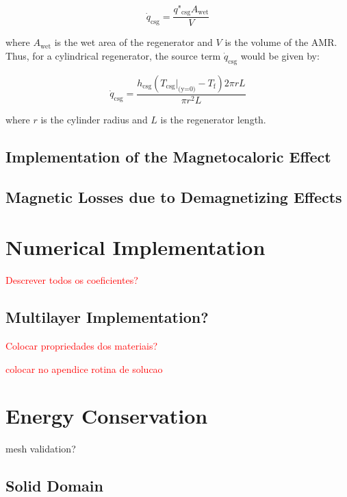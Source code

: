 \documentclass[review,preprint,12pt]{elsarticle}
\begin{document}
\begin{equation}
\dot{q}_\textrm{csg} = \frac{q\textrm{"}_\textrm{csg}A_\textrm{wet}}{V}
\label{Q_csg}
\end{equation}

\noindent where $A_\textrm{wet}$ is the wet area of the regenerator and $V$ is the volume of the AMR. Thus, for a cylindrical regenerator, the source term $\dot{q}_\textrm{csg}$ would be given by:

\begin{equation}
\dot{q}_\textrm{csg} = \frac{ h_\textrm{csg}(T_\textrm{csg}|_\textrm{(y=0)} - T_\textrm{f})2\pi rL}{\pi r^2L}
\label{Q_csg_cylindrical}
\end{equation}

\noindent where $r$ is the cylinder radius and $L$ is the regenerator length.

\subsection{Implementation of the Magnetocaloric Effect}


\subsection{Magnetic Losses due to Demagnetizing Effects}

\section{Numerical Implementation}
\textcolor{red}{Descrever todos os coeficientes?}

\subsection{Multilayer Implementation?}

\textcolor{red}{Colocar propriedades dos materiais?}

\textcolor{red}{colocar no apendice rotina de solucao}



\section{Energy Conservation}
mesh validation?

\subsection{Solid Domain}
\end{document}
